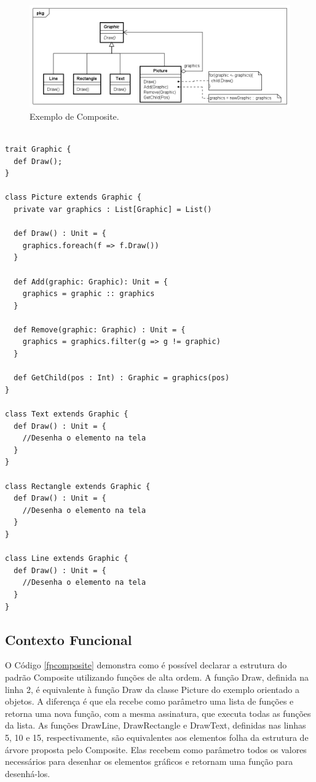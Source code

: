 \begin{figure}[htb]
	\caption{\label{composite_exemplo}Exemplo de Composite.}
	\begin{center}
	    \includegraphics[scale=0.5]{5_padroes-contexto-funcional/5.2_estruturais/5.2.3_composite/composite_exemplo.png}
	\end{center}
\end{figure}

\begin{lstlisting}[caption={Composite Orientado a Objetos.},label=oocomposite]

trait Graphic {
  def Draw();
}

class Picture extends Graphic {
  private var graphics : List[Graphic] = List()

  def Draw() : Unit = {
    graphics.foreach(f => f.Draw())
  }

  def Add(graphic: Graphic): Unit = {
    graphics = graphic :: graphics
  }

  def Remove(graphic: Graphic) : Unit = {
    graphics = graphics.filter(g => g != graphic)
  }

  def GetChild(pos : Int) : Graphic = graphics(pos)
}

class Text extends Graphic {
  def Draw() : Unit = {
    //Desenha o elemento na tela
  }
}

class Rectangle extends Graphic {
  def Draw() : Unit = {
    //Desenha o elemento na tela
  }
}

class Line extends Graphic {
  def Draw() : Unit = {
    //Desenha o elemento na tela
  }
}

\end{lstlisting}

\subsection*{Contexto Funcional}

O Código \ref{fpcomposite} demonstra como é 
possível declarar a estrutura do padrão Composite 
utilizando funções de alta ordem. A função 
Draw, definida na linha 2, é equivalente à função 
Draw da classe Picture do exemplo orientado a 
objetos. A diferença é que ela recebe como parâmetro 
uma lista de funções e retorna uma nova função, 
com a mesma assinatura, que executa todas as 
funções da lista. As funções DrawLine, DrawRectangle 
e DrawText, definidas nas linhas 5, 10 e 15, 
respectivamente, são equivalentes aos elementos 
folha da estrutura de árvore proposta pelo 
Composite. Elas recebem como parâmetro todos 
os valores necessários para desenhar os elementos 
gráficos e retornam uma função para 
desenhá-los.

